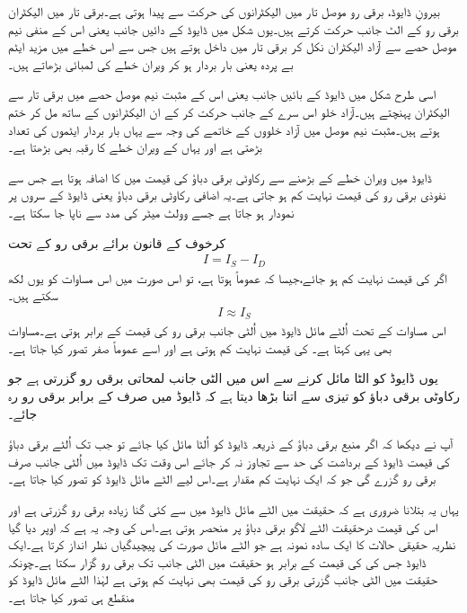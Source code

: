 بیرونِ ڈایوڈ، برقی رو موصل تار میں الیکٹرانوں کی حرکت سے پیدا ہوتی ہے۔برقی تار میں الیکٹران برقی رو  کے الٹ جانب حرکت کرتے ہیں۔یوں شکل میں ڈایوڈ کے دائیں جانب یعنی اس کے منفی نیم موصل حصے سے آزاد الیکٹران نکل کر برقی تار میں داخل ہوتے ہیں جس سے اس خطے میں مزید ایٹم  بے پردہ یعنی بار بردار ہو کر ویران خطے کی لمبائی بڑھاتے ہیں۔

اسی طرح شکل میں ڈایوڈ کے بائیں جانب یعنی اس کے مثبت نیم موصل حصے میں برقی تار سے الیکٹران پہنچتے ہیں۔آزاد خلو اس سرے کے جانب حرکت کر کے ان الیکٹرانوں کے ساتھ مل کر ختم ہوتے ہیں۔مثبت نیم موصل میں آزاد خلووں کے خاتمے کی وجہ سے یہاں بار بردار ایٹموں کی تعداد بڑھتی ہے اور یہاں کے ویران خطے کا رقبہ بھی بڑھتا ہے۔

ڈایوڈ میں ویران خطے کے بڑھنے سے رکاوٹی برقی دباؤ کی قیمت میں  کا اضافہ ہوتا ہے جس سے نفوذی برقی رو  کی قیمت نہایت کم ہو جاتی ہے۔یہ اضافی رکاوٹی برقی دباؤ یعنی   ڈایوڈ کے سروں پر نمودار ہو جاتا ہے  جسے وولٹ میٹر کی مدد سے ناپا جا سکتا ہے۔

کرخوف کے قانون برائے برقی رو کے تحت 
\begin{align}
I=I_S-I_D
\end{align}
اگر  کی قیمت نہایت کم ہو جائے،جیسا کہ عموماً ہوتا ہے، تو اس صورت میں اس مساوات کو یوں لکھ سکتے ہیں۔
\begin{align}
I \approx I_S
\end{align}
اس مساوات کے تحت اُلٹے مائل ڈایوڈ میں اُلٹی جانب برقی رو کی قیمت  کے برابر ہوتی ہے۔مساوات   بھی یہی کہتا ہے۔ کی قیمت نہایت کم ہوتی ہے اور اسے عموماً صفر تصور کیا جاتا ہے۔

یوں ڈایوڈ کو الٹا مائل کرنے سے اس میں الٹی جانب لمحاتی برقی رو گزرتی ہے جو رکاوٹی برقی دباؤ کو تیزی سے اتنا بڑھا دیتا ہے کہ ڈایوڈ میں صرف   کے برابر برقی رو رہ جائے۔

آپ نے دیکھا کہ اگر منبع برقی دباؤ  کے ذریعہ ڈایوڈ کو اُلٹا مائل کیا جائے تو جب تک اُلٹے برقی دباؤ کی قیمت ڈایوڈ کے برداشت کی حد سے تجاوز نہ کر جائے اس وقت تک ڈایوڈ میں اُلٹی جانب صرف  برقی رو گزرے گی جو کہ ایک نہایت کم مقدار ہے۔اس لیے الٹے مائل  ڈایوڈ کو   تصور کیا جاتا ہے۔

یہاں یہ بتلانا ضروری ہے کہ حقیقت میں الٹے مائل  ڈایوڈ میں   سے کئی گنا زیادہ برقی رو گزرتی ہے اور اس کی قیمت درحقیقت الٹے لاگو برقی دباؤ پر منحصر ہوتی ہے۔اس کی وجہ یہ ہے کہ اوپر دیا گیا نظریہ حقیقی حالات کا ایک سادہ نمونہ ہے جو الٹے مائل صورت کی پیچیدگیاں نظر انداز کرتا ہے۔ایک ڈایوڈ جس کی  کی قیمت  کے برابر ہو حقیقت میں الٹی جانب    تک برقی رو گزار سکتا ہے۔چونکہ حقیقت میں الٹی جانب گزرتی برقی رو کی قیمت بھی نہایت کم ہوتی ہے لہٰذا الٹے مائل  ڈایوڈ کو منقطع ہی تصور کیا جاتا ہے۔



